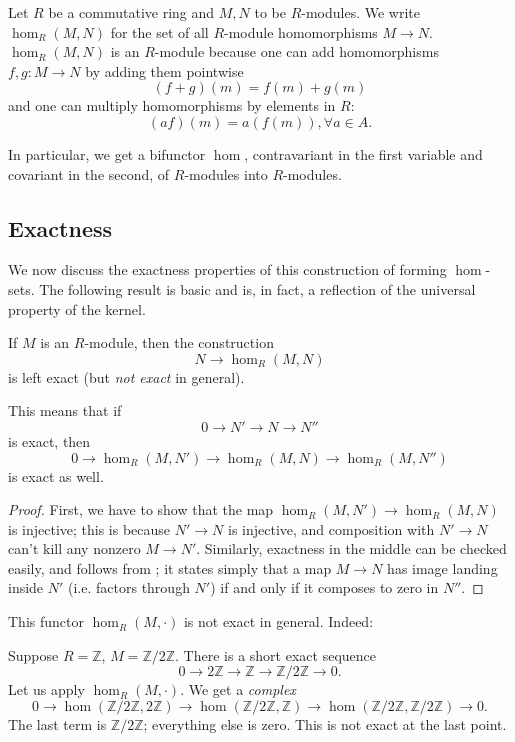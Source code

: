 \begin{definition}
Let $R$ be a commutative ring and $M,N$ to be $R$-modules.  We write
$\hom_R(M,N)$ for
the set of all $R$-module homomorphisms $M \to N$.
 $\hom_R(M,N)$ is an $R$-module because one can add homomorphisms $f,g: M
\to N$ by adding
them pointwise
\[ (f+g)(m) = f(m)+g(m)  \]
and one can multiply homomorphisms by elements in $R$:
\[ (af)(m) = a(f(m)), \forall a \in A.  \]
\end{definition}

In particular, we get a bifunctor $\hom$, contravariant in the first variable
and covariant in the second, of $R$-modules into $R$-modules.

\subsection{Exactness}

We now discuss the exactness properties of this construction of forming
$\hom$-sets. The following result is basic and is, in fact, a reflection of
the universal property of the kernel.
\begin{proposition}
If $M$ is an $R$-module, then the construction
\[ N \to \hom_R(M,N)  \]
is left exact (but \emph{not exact} in general).
\end{proposition}
This means that if
\[ 0 \to N' \to N \to N''  \]
is exact,
then
\[ 0 \to \hom_R(M, N') \to \hom_R(M, N) \to \hom_R(M, N'')  \]
is exact as well.

\begin{proof}
 First, we have to show that the map
$\hom_R(M,N') \to \hom_R(M,N)$ is injective; this is because $N' \to N$ is
injective, and composition with $N' \to N$ can't kill any nonzero $M \to N'$.
Similarly, exactness in the middle can be checked easily, and follows from
; it states simply that a map $M \to N$ has
image landing inside $N'$ (i.e. factors through $N'$) if and only if it
composes to zero in $N''$.
\end{proof}

This functor $\hom_R(M, \cdot)$  is not exact in general.  Indeed:
\begin{example}
Suppose $R = \mathbb{Z}$, $M = \mathbb{Z}/2\mathbb{Z}$. There is a short exact
sequence
\[ 0 \to 2\mathbb{Z} \to \mathbb{Z} \to \mathbb{Z}/2\mathbb{Z} \to 0.  \]
Let us apply $\hom_R(M, \cdot)$. We get a \emph{complex}
\[ 0 \to \hom(\mathbb{Z}/2\mathbb{Z}, 2\mathbb{Z}) \to
\hom(\mathbb{Z}/2\mathbb{Z}, \mathbb{Z}) \to \hom(\mathbb{Z}/2\mathbb{Z},
\mathbb{Z}/2\mathbb{Z}) \to 0.  \]
The last term is $\mathbb{Z}/2\mathbb{Z}$; everything else is zero. This is not
exact at the last point.
\end{example}

